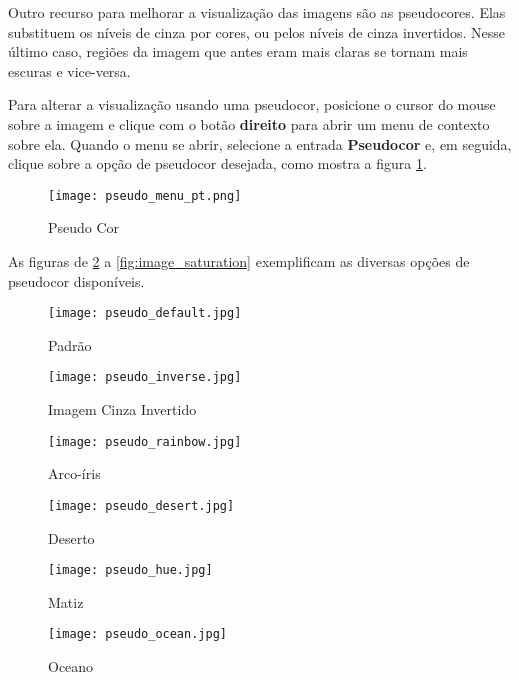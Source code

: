 Outro recurso para melhorar a visualização das imagens são as pseudocores. Elas substituem os níveis
de cinza por cores, ou pelos níveis de cinza invertidos. Nesse último caso, regiões da imagem que
antes eram mais claras se tornam mais escuras e vice-versa.

Para alterar a visualização usando uma pseudocor, posicione o cursor do mouse sobre a imagem e clique
com o botão \textbf{direito} para abrir um menu de contexto sobre ela. Quando o menu se abrir,
selecione a entrada \textbf{Pseudocor} e, em seguida, clique sobre a opção de pseudocor desejada, como
mostra a figura \ref{fig:pseudo_color}.

\begin{figure}[H]
\centering
\texttt{[image: pseudo\_menu\_pt.png]}
\caption{Pseudo Cor}
\label{fig:pseudo_color}
\end{figure}

As figuras de \ref{fig:image_default} a \ref{fig:image_saturation} exemplificam as diversas opções de
pseudocor disponíveis.\\

\begin{figure}[H]
\centering
\texttt{[image: pseudo\_default.jpg]}
\caption{Padrão}
\label{fig:image_default}
\end{figure}

\begin{figure}[H]
\centering
\texttt{[image: pseudo\_inverse.jpg]}
\caption{Imagem Cinza Invertido}
\label{fig:image_inverted}
\end{figure}

\begin{figure}[H]
\centering
\texttt{[image: pseudo\_rainbow.jpg]}
\caption{Arco-íris}
\label{fig:image_arc}
\end{figure}

\begin{figure}[H]
\centering
\texttt{[image: pseudo\_desert.jpg]}
\caption{Deserto}
\label{fig:image_desert}
\end{figure}

\begin{figure}[H]
\centering
\texttt{[image: pseudo\_hue.jpg]}
\caption{Matiz}
\label{fig:image_matiz}
\end{figure}

\begin{figure}[H]
\centering
\texttt{[image: pseudo\_ocean.jpg]}
\caption{Oceano}
\label{fig:image_ocean}
\end{figure}


